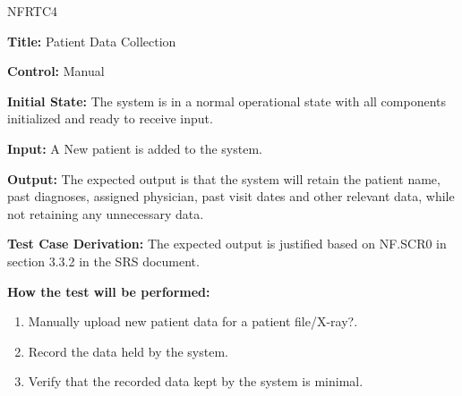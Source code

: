 \documentclass[12pt, titlepage]{article}
\begin{document}
\begin{itemize}
    \begin{item}
        NFRTC4
        \begin{mdframed}[linewidth=0.5mm]
            \textbf{Title:} Patient Data Collection \par
            \textbf{Control:} Manual \par
            \textbf{Initial State:} The system is in a normal operational state with all components initialized and ready to receive input. \par
            \textbf{Input:} A New patient is added to the system. \par
            \textbf{Output:} The expected output is that the system will retain the patient name, past diagnoses, assigned physician, past visit dates and other relevant data, while not retaining any unnecessary data. \par
            \textbf{Test Case Derivation:} The expected output is justified based on NF.SCR0 in section 3.3.2 in the SRS document. \par
            \textbf{How the test will be performed:}
            \begin{enumerate}[noitemsep]
                \item Manually upload new patient data for a patient file/X-ray?.
                \item Record the data held by the system.
                \item Verify that the recorded data kept by the system is minimal.
            \end{enumerate}
        \end{mdframed}
    \end{item}


\end{itemize}
\end{document}
